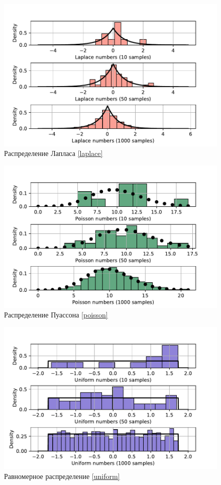 \documentclass[a4paper]{article}
\begin{document}
\begin{figure}[H]
    \centering
    \includegraphics[width = 16 cm]{sources/laplaceNumbers.pdf}
    \caption{Распределение Лапласа \eqref{laplace}}
    \label{fig:laplace}
\end{figure}
\begin{figure}[H]
    \centering
    \includegraphics[width = 16 cm]{sources/poissonNumbers.pdf}
    \caption{Распределение Пуассона \eqref{poisson}}
    \label{fig:poisson}
\end{figure}
\begin{figure}[H]
    \centering
    \includegraphics[width = 16 cm]{sources/uniformNumbers.pdf}
    \caption{Равномерное распределение \eqref{uniform}}
    \label{fig:uniform}
\end{figure}
\end{document}
